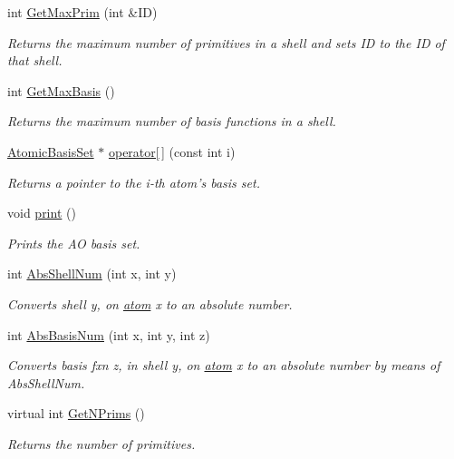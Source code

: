 \begin{DoxyCompactItemize}
int \hyperlink{classJKBuilder_1_1AOBasisSet_a03191bf41d6e3a2445dd3eb8640305be}{GetMaxPrim} (int \&ID)
\begin{DoxyCompactList}\small\item\em Returns the maximum number of primitives in a shell and sets ID to the ID of that shell. \item\end{DoxyCompactList}\item 
int \hyperlink{classJKBuilder_1_1AOBasisSet_adcda37af511d6b4f8d305fcba2da5c4a}{GetMaxBasis} ()
\begin{DoxyCompactList}\small\item\em Returns the maximum number of basis functions in a shell. \item\end{DoxyCompactList}\item 
\hyperlink{classJKBuilder_1_1AtomicBasisSet}{AtomicBasisSet} $\ast$ \hyperlink{classJKBuilder_1_1AOBasisSet_a1d366290bc84106b0a92c61156a4fa80}{operator\mbox{[}$\,$\mbox{]}} (const int i)
\begin{DoxyCompactList}\small\item\em Returns a pointer to the i-\/th atom's basis set. \item\end{DoxyCompactList}\item 
void \hyperlink{classJKBuilder_1_1AOBasisSet_a388f572c62279f839ee138a9afbdeeb5}{print} ()
\begin{DoxyCompactList}\small\item\em Prints the AO basis set. \item\end{DoxyCompactList}\item 
int \hyperlink{classJKBuilder_1_1AOBasisSet_aa1fc6892f227f640de8bc2d6aa127d5f}{AbsShellNum} (int x, int y)
\begin{DoxyCompactList}\small\item\em Converts shell y, on \hyperlink{classJKBuilder_1_1atom}{atom} x to an absolute number. \item\end{DoxyCompactList}\item 
int \hyperlink{classJKBuilder_1_1AOBasisSet_a23219e59060d6ef915e6146114f52ddd}{AbsBasisNum} (int x, int y, int z)
\begin{DoxyCompactList}\small\item\em Converts basis fxn z, in shell y, on \hyperlink{classJKBuilder_1_1atom}{atom} x to an absolute number by means of AbsShellNum. \item\end{DoxyCompactList}\item 
virtual int \hyperlink{classJKBuilder_1_1BasisSet_abc886cd4e35d3c56a0250b7d06986f61}{GetNPrims} ()
\begin{DoxyCompactList}\small\item\em Returns the number of primitives. \item\end{DoxyCompactList}\end{DoxyCompactItemize}
